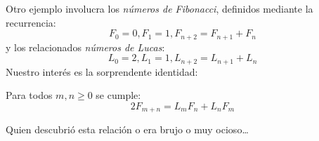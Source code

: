   Otro ejemplo involucra los \emph{números de Fibonacci},%
  definidos mediante la recurrencia:
  \begin{equation}
    \label{eq:Fibonacci-recurrence}
    F_0
      = 0,
    F_1
      = 1,
    F_{n + 2}
      = F_{n + 1} + F_n
  \end{equation}
  y los relacionados \emph{números de Lucas}:%
  \begin{equation}
    \label{eq:Lucas-recurrence}
    L_0
      = 2,
    L_1
      = 1,
    L_{n + 2}
      = L_{n + 1} + L_n
  \end{equation}
  Nuestro interés es la sorprendente identidad:
  \begin{proposition}
    Para todos \(m, n \ge 0\) se cumple:
    \begin{equation}
      \label{eq:Fibonacci-Lucas}
      2 F_{m + n}
	= L_m F_n + L_n F_m
    \end{equation}
  \end{proposition}
  Quien descubrió esta relación o era brujo o muy ocioso\ldots
